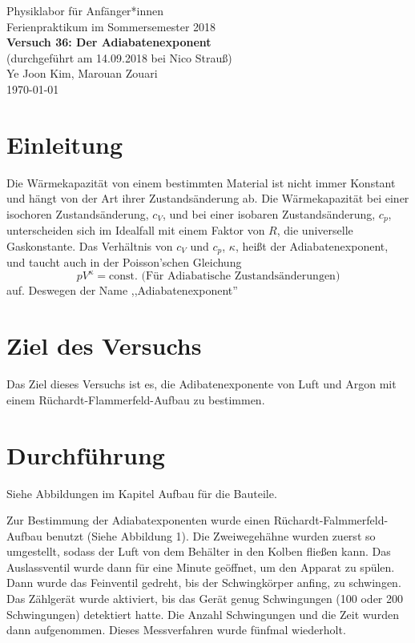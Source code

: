 \documentclass[11pt,a4paper]{article} %
\begin{document}
{
	\centering 
	\large 
	Physiklabor für Anfänger*innen \\
	Ferienpraktikum im Sommersemester 2018 \\[4mm]
	\textbf{\LARGE 
		Versuch 36: Der Adiabatenexponent
	} \\[3mm]
	(durchgeführt am 14.09.2018 bei Nico Strauß) \\
	Ye Joon Kim, Marouan Zouari\\
	\today \\[10mm]
}

\section{Einleitung}
Die Wärmekapazität von einem bestimmten Material ist nicht immer Konstant und hängt von der Art ihrer Zustandsänderung ab. Die Wärmekapazität bei einer isochoren Zustandsänderung, $c_V$, und bei einer isobaren Zustandsänderung, $c_p$, unterscheiden sich im Idealfall mit einem Faktor von $R$, die universelle Gaskonstante. Das Verhältnis von $c_V$ und $c_p$, $\kappa$, heißt der Adiabatenexponent, und taucht auch in der Poisson'schen Gleichung 
$$pV^\kappa = \textrm{const.  (Für Adiabatische Zustandsänderungen)}$$ 
auf. Deswegen der Name ,,Adiabatenexponent''

\section{Ziel des Versuchs}
Das Ziel dieses Versuchs ist es, die Adibatenexponente von Luft und Argon mit einem Rüchardt-Flammerfeld-Aufbau zu bestimmen. 

\section{Durchführung}
Siehe Abbildungen im Kapitel Aufbau für die Bauteile. 

Zur Bestimmung der Adiabatexponenten wurde einen Rüchardt-Falmmerfeld-Aufbau benutzt (Siehe Abbildung 1). Die Zweiwegehähne wurden zuerst so umgestellt, sodass der Luft von dem Behälter in den Kolben fließen kann. Das Auslassventil wurde dann für eine Minute geöffnet, um den Apparat zu spülen. Dann wurde das Feinventil gedreht, bis der Schwingkörper anfing, zu schwingen. Das Zählgerät wurde aktiviert, bis das Gerät genug Schwingungen (100 oder 200 Schwingungen) detektiert hatte. Die Anzahl Schwingungen und die Zeit wurden dann aufgenommen. Dieses Messverfahren wurde fünfmal wiederholt.
\end{document}
